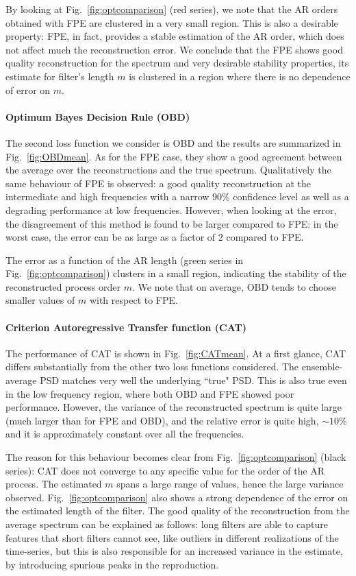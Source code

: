 \documentclass{aa}
\begin{document}
By looking at Fig.~\ref{fig:optcomparison} (red series), we note that the AR orders obtained with 
FPE are clustered in a very small region. This is also a desirable property: FPE, in fact, provides a stable 
estimation of the AR order, which does not affect much the reconstruction error.
We conclude that the FPE shows good quality reconstruction for the spectrum and very desirable stability properties, its estimate for filter's length $m$ is clustered in a region where there is no dependence of error on $m$. 
\paragraph{Optimum Bayes Decision Rule (OBD)}
The second loss function we consider is OBD and the results are summarized in Fig.~\ref{fig:OBDmean}. As for the FPE case, they show a good agreement between the average over the reconstructions and the true spectrum.
Qualitatively the same behaviour of FPE is observed: a good quality reconstruction at the intermediate and high frequencies with a narrow $90\%$ confidence level as well as a degrading performance at low frequencies.
However, when looking at the error, the disagreement of this method is found to be larger compared to FPE: 
in the worst case, the error can be as large as a factor of $2$ compared to FPE. 

The error as a function of the AR length (green series in Fig.~\ref{fig:optcomparison}) clusters in a small region, indicating the stability of the reconstructed process order $m$. We note that on average, OBD tends to choose smaller values of $m$ with respect to FPE.

\paragraph{Criterion Autoregressive Transfer function (CAT)}
The performance of CAT is shown in Fig.~\ref{fig:CATmean}. At a first glance, CAT differs substantially from the other two loss functions considered.
The ensemble-average PSD matches very well the underlying ``true" PSD. This is also true even in the low frequency region, 
where both OBD and FPE showed poor performance.
However, the variance of the reconstructed spectrum is quite large (much larger than for FPE and OBD), and the relative error is quite high, $\sim 10\%$ and it is approximately constant over all the frequencies.

The reason for this behaviour becomes clear from Fig.~\ref{fig:optcomparison} (black series): CAT does not converge 
to any specific value for the order of the AR process. The estimated $m$ spans a large range of values, hence the large variance observed.
Fig.~\ref{fig:optcomparison} also shows a strong dependence of the error on the estimated length of the filter. The good quality of the reconstruction from the average spectrum can be explained as follows: long filters are able to capture features that short filters cannot see, like outliers in different realizations of the time-series, but this is also responsible for an increased variance in the estimate, by introducing spurious peaks in the reproduction.
\end{document}
